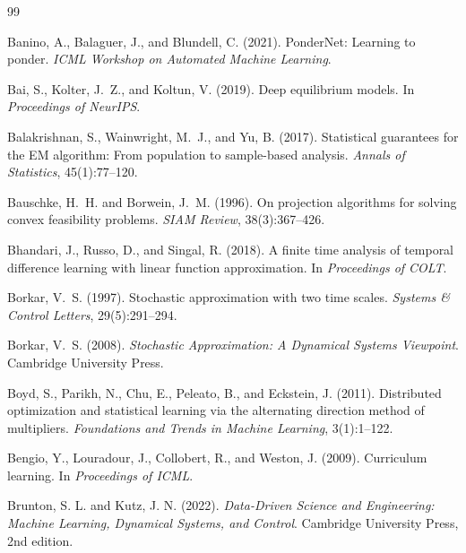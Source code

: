 \documentclass[12pt,a4paper]{article}
\begin{document}
\begin{thebibliography}{99}

Banino, A., Balaguer, J., and Blundell, C. (2021).
\newblock PonderNet: Learning to ponder.
\newblock \emph{ICML Workshop on Automated Machine Learning}.

Bai, S., Kolter, J.~Z., and Koltun, V. (2019).
\newblock Deep equilibrium models.
\newblock In \emph{Proceedings of NeurIPS}.

Balakrishnan, S., Wainwright, M.~J., and Yu, B. (2017).
\newblock Statistical guarantees for the EM algorithm: From population to
  sample-based analysis.
\newblock \emph{Annals of Statistics}, 45(1):77--120.

Bauschke, H.~H. and Borwein, J.~M. (1996).
\newblock On projection algorithms for solving convex feasibility problems.
\newblock \emph{SIAM Review}, 38(3):367--426.

Bhandari, J., Russo, D., and Singal, R. (2018).
\newblock A finite time analysis of temporal difference learning with linear
  function approximation.
\newblock In \emph{Proceedings of COLT}.

Borkar, V.~S. (1997).
\newblock Stochastic approximation with two time scales.
\newblock \emph{Systems \& Control Letters}, 29(5):291--294.

Borkar, V.~S. (2008).
\newblock \emph{Stochastic Approximation: A Dynamical Systems Viewpoint}.
\newblock Cambridge University Press.

Boyd, S., Parikh, N., Chu, E., Peleato, B., and Eckstein, J. (2011).
\newblock Distributed optimization and statistical learning via the alternating
  direction method of multipliers.
\newblock \emph{Foundations and Trends in Machine Learning}, 3(1):1--122.

Bengio, Y., Louradour, J., Collobert, R., and Weston, J. (2009).
\newblock Curriculum learning.
\newblock In \emph{Proceedings of ICML}.

Brunton, S. L. and Kutz, J. N. (2022).
\newblock \emph{Data-Driven Science and Engineering: Machine Learning,
  Dynamical Systems, and Control}.
\newblock Cambridge University Press, 2nd edition.


\end{thebibliography}
\end{document}
